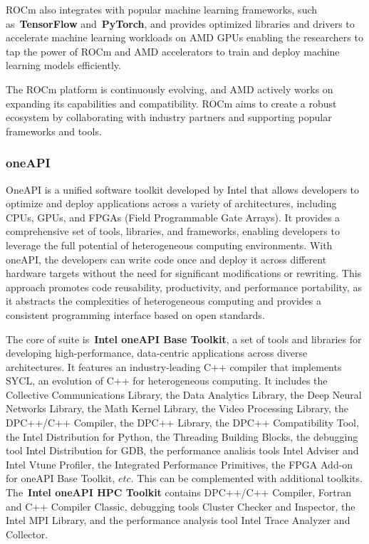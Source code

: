 \par
ROCm also integrates with popular machine learning frameworks, such as~\textbf{TensorFlow} and~\textbf{PyTorch}, and provides optimized libraries and drivers to accelerate machine learning workloads on AMD GPUs enabling the researchers to tap the power of ROCm and AMD accelerators to train and deploy machine learning models efficiently.


\par
The ROCm platform is continuously evolving, and AMD actively works on expanding its capabilities and compatibility. ROCm aims to create a robust ecosystem by collaborating with industry partners and supporting popular frameworks and tools. 


\subsubsection{oneAPI}


\par
OneAPI is a unified software toolkit developed by Intel that allows developers to optimize and deploy applications across a variety of architectures, including CPUs, GPUs, and FPGAs (Field Programmable Gate Arrays).
It provides a comprehensive set of tools, libraries, and frameworks, enabling developers to leverage the full potential of heterogeneous computing environments.
With oneAPI, the developers can write code once and deploy it across different hardware targets without the need for significant modifications or rewriting.
This approach promotes code reusability, productivity, and performance portability, as it abstracts the complexities of heterogeneous computing and provides a consistent programming interface based on open standards.


\par
The core of suite is~\textbf{Intel oneAPI Base Toolkit}, a set of tools and libraries for developing high-performance, data-centric applications across diverse architectures.
It features an industry-leading C++ compiler that implements SYCL, an evolution of C++ for heterogeneous computing.
It includes the Collective Communications Library, the Data Analytics Library, the Deep Neural Networks Library, the Math Kernel Library, the Video Processing Library, the DPC++/C++ Compiler, the DPC++ Library, the DPC++ Compatibility Tool, the Intel Distribution for Python, the Threading Building Blocks, the debugging tool Intel Distribution for GDB, the performance analisis tools Intel Adviser and Intel Vtune Profiler, the Integrated Performance Primitives,
the FPGA Add-on for oneAPI Base Toolkit, $etc$.
This can be complemented with additional toolkits.
The~\textbf{Intel oneAPI HPC Toolkit} contains DPC++/C++ Compiler, Fortran and C++ Compiler Classic, debugging tools Cluster Checker and Inspector, the Intel MPI Library, and the performance analysis tool Intel Trace Analyzer and Collector.

